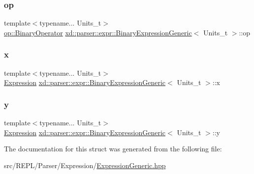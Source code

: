 \subsubsection{\texorpdfstring{op}{op}}
{\footnotesize\ttfamily template$<$typename... Units\+\_\+t$>$ \\
\mbox{\hyperlink{namespacexd_1_1parser_1_1expr_1_1op_a5d85beecf0ae4a43576fdeacb264886a}{op\+::\+Binary\+Operator}} \mbox{\hyperlink{structxd_1_1parser_1_1expr_1_1_binary_expression_generic}{xd\+::parser\+::expr\+::\+Binary\+Expression\+Generic}}$<$ Units\+\_\+t $>$\+::op}

\mbox{\label{structxd_1_1parser_1_1expr_1_1_binary_expression_generic_abb831e984c717ab64e8ea91495b104a0}} 
\subsubsection{\texorpdfstring{x}{x}}
{\footnotesize\ttfamily template$<$typename... Units\+\_\+t$>$ \\
\mbox{\hyperlink{structxd_1_1parser_1_1expr_1_1_expression_generic}{Expression}} \mbox{\hyperlink{structxd_1_1parser_1_1expr_1_1_binary_expression_generic}{xd\+::parser\+::expr\+::\+Binary\+Expression\+Generic}}$<$ Units\+\_\+t $>$\+::x}

\mbox{\label{structxd_1_1parser_1_1expr_1_1_binary_expression_generic_a22a6d086ea68984905e80f86321e815f}} 
\subsubsection{\texorpdfstring{y}{y}}
{\footnotesize\ttfamily template$<$typename... Units\+\_\+t$>$ \\
\mbox{\hyperlink{structxd_1_1parser_1_1expr_1_1_expression_generic}{Expression}} \mbox{\hyperlink{structxd_1_1parser_1_1expr_1_1_binary_expression_generic}{xd\+::parser\+::expr\+::\+Binary\+Expression\+Generic}}$<$ Units\+\_\+t $>$\+::y}



The documentation for this struct was generated from the following file\+:\begin{DoxyCompactItemize}
\item 
src/\+R\+E\+P\+L/\+Parser/\+Expression/\mbox{\hyperlink{_expression_generic_8hpp}{Expression\+Generic.\+hpp}}\end{DoxyCompactItemize}
